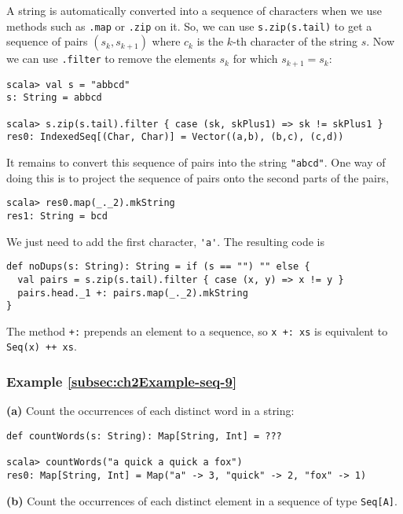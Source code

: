A string is automatically converted into a sequence of characters
when we use methods such as \lstinline!.map!
or \lstinline!.zip! on
it. So, we can use \lstinline!s.zip(s.tail)!
to get a sequence of pairs $\left(s_{k},s_{k+1}\right)$ where $c_{k}$
is the $k$-th character of the string $s$. Now we can use \lstinline!.filter!
to remove the elements $s_{k}$ for which $s_{k+1}=s_{k}$:
\begin{lstlisting}
scala> val s = "abbcd"
s: String = abbcd

scala> s.zip(s.tail).filter { case (sk, skPlus1) => sk != skPlus1 }
res0: IndexedSeq[(Char, Char)] = Vector((a,b), (b,c), (c,d))
\end{lstlisting}
It remains to convert this sequence of pairs into the string \lstinline!"abcd"!.
One way of doing this is to project the sequence of pairs onto the
second parts of the pairs,
\begin{lstlisting}
scala> res0.map(_._2).mkString
res1: String = bcd
\end{lstlisting}
We just need to add the first character, \lstinline!'a'!.
The resulting code is
\begin{lstlisting}
def noDups(s: String): String = if (s == "") "" else {
  val pairs = s.zip(s.tail).filter { case (x, y) => x != y }
  pairs.head._1 +: pairs.map(_._2).mkString
}
\end{lstlisting}
The method \lstinline!+:!
prepends an element to a sequence, so \lstinline!x +: xs!
is equivalent to \lstinline!Seq(x) ++ xs!.

\subsubsection{Example \label{subsec:ch2Example-seq-9}\ref{subsec:ch2Example-seq-9}}

\textbf{(a)} Count the occurrences of each distinct word in a string:
\begin{lstlisting}
def countWords(s: String): Map[String, Int] = ???

scala> countWords("a quick a quick a fox")
res0: Map[String, Int] = Map("a" -> 3, "quick" -> 2, "fox" -> 1)
\end{lstlisting}
\textbf{(b)} Count the occurrences of each distinct element in a sequence
of type \lstinline!Seq[A]!.

